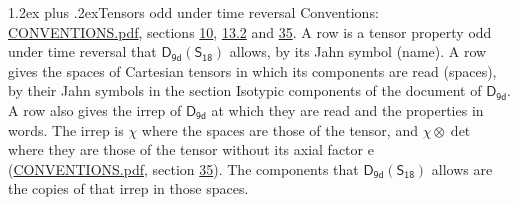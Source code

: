 \documentclass[10pt,a4paper]{article}
\makeatletter
\renewcommand\section{\@startsection{section}{1}{\z@}{-3ex plus -1ex minus -.2ex}%
  {1.2ex plus .2ex}{\normalfont\large\sffamily\bfseries\color{parttitle}}}
\numberwithin{equation}{section}
\newcommand{\grp}[1]{\mathsf{#1}}
\newcommand{\irrprod}{\otimes}
\makeatother
\begin{document}
\section{Tensors odd under time reversal}\label{s:time_odd}
Conventions: \href{../../CONVENTIONS.pdf}{CONVENTIONS.pdf}, sections \href{../../../rotation/CONVENTIONS.pdf\#conv.10}{10}, \href{../../../rotation/CONVENTIONS.pdf\#conv.13.2}{13.2} and \href{../../CONVENTIONS.pdf\#conv.35}{35}.
\leavevmode\label{n:head.name.property}A row is a tensor property odd under time reversal that $\grp{D_{9d}}(\grp{S_{18}})$ allows, by its Jahn symbol (name). \label{n:head.spaces}A row gives the spaces of Cartesian tensors in which its components are read (spaces), by their Jahn symbols in the section Isotypic components of the document of \href{../../../rotation/data/pdf/D9d.pdf}{$\grp{D_{9d}}$}. \label{n:head.properties}A row also gives the irrep of $\grp{D_{9d}}$ at which they are read and the properties in words. The irrep is $\chi$ where the spaces are those of the tensor, and $\chi \irrprod \det$ where they are those of the tensor without its axial factor e (\href{../../CONVENTIONS.pdf}{CONVENTIONS.pdf}, section \href{../../CONVENTIONS.pdf\#conv.35}{35}). The components that $\grp{D_{9d}}(\grp{S_{18}})$ allows are the copies of that irrep in those spaces.
\end{document}
